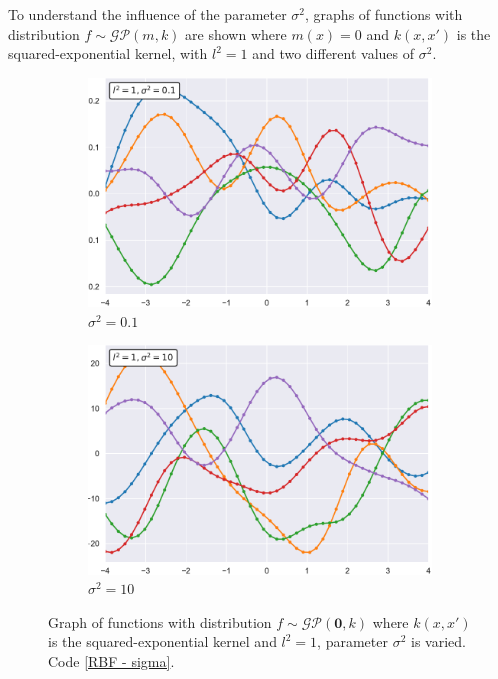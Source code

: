 To understand the influence of the parameter $\sigma^2$, graphs of functions with distribution $f\sim \mathcal{GP}(m,k)$ are shown where $m(x)=0$ and $k(x,x')$ is the squared-exponential kernel, with $l^2=1$ and two different values of $\sigma^2$.
\begin{figure}[h]
\centering
\begin{subfigure}{.5\textwidth}
  \centering
  \includegraphics[width=\linewidth]{images/Gaussian process/RBF - sigma=01.pdf}
  \caption{$\sigma^2=0.1$}
\end{subfigure}%
\begin{subfigure}{.5\textwidth}
  \centering
  \includegraphics[width=\linewidth]{images/Gaussian process/RBF - sigma=10.pdf}
  \caption{$\sigma^2=10$}
\end{subfigure}
\caption{Graph of functions with distribution $f\sim \mathcal{GP}(\bm{0},k)$ where $k(x,x')$ is the squared-exponential kernel and $l^2=1$, parameter $\sigma^2$ is varied. Code \ref{RBF - sigma}.}
\label{10 sample exponential modified sigma}
\end{figure}

